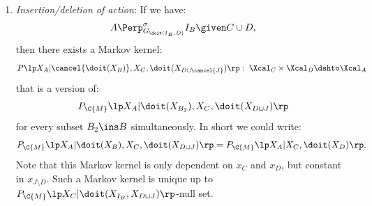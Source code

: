 \begin{Cor}
\begin{enumerate}
            \[ P_{\C{M}}\lp X_A|\doit(X_B),X_C,\doit(X_D)\rp  =  P_{\C{M}}\lp X_A|X_B,X_C,\doit(X_D)\rp.\]
            since these Markov kernels are constant in $x_{J\setminus D}$.
            Such a Markov kernel is unique up to $P_{\C{M}}\lp X_B,X_C|\doit(X_{I_B},X_{D\cup J})\rp$-null set.
         \item \emph{Insertion/deletion of action}: If we have:
            \[ A \Perp^\sigma_{G_{\doit(I_B,D)}} I_B \given C  \cup D,   \]
            then there exists a Markov kernel: 
            \[P\lp X_A|\cancel{\doit(X_B)},X_C,\doit(X_{D\cup \cancel{J}})\rp:\; \Xcal_C \times \Xcal_{D} \dshto \Xcal_A\] 
            that is a version of:  
            \[ P_{\C{M}}\lp X_A|\doit(X_{B_2}),X_C,\doit(X_{D\cup J})\rp\]
            for every subset $B_2 \ins B$ simultaneously. In short we could write:
            \[ P_{\C{M}}\lp X_A|\doit(X_B),X_C,\doit(X_{D\cup J})\rp = P_{\C{M}}\lp X_A|X_C,\doit(X_{D})\rp.\]
            Note that this Markov kernel is only dependent on $x_C$ and $x_{D}$, but constant in $x_{J\setminus D}$.
            Such a Markov kernel is unique up to $P_{\C{M}}\lp X_C|\doit(X_{I_B},X_{D\cup J})\rp$-null set.
    \end{enumerate}
\end{Cor}
